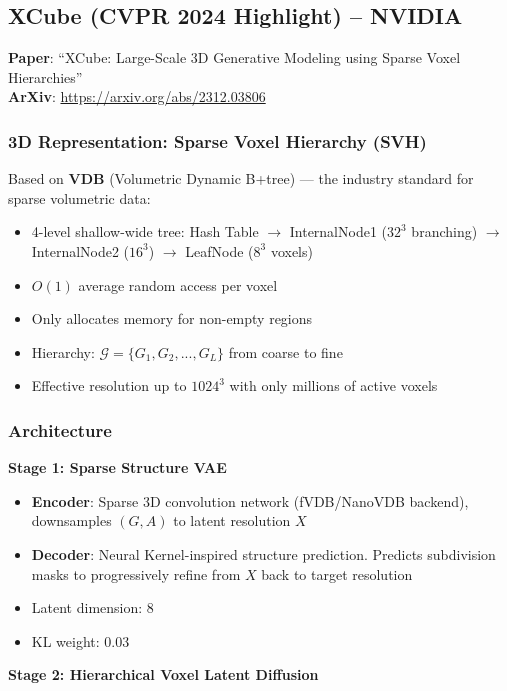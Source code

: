 \documentclass[11pt, a4paper]{article}
\begin{document}
\subsection{XCube (CVPR 2024 Highlight) -- NVIDIA}

\textbf{Paper}: ``XCube: Large-Scale 3D Generative Modeling using Sparse Voxel Hierarchies''\\
\textbf{ArXiv}: \url{https://arxiv.org/abs/2312.03806}

\subsubsection{3D Representation: Sparse Voxel Hierarchy (SVH)}

Based on \textbf{VDB} (Volumetric Dynamic B+tree) --- the industry standard for sparse volumetric data:
\begin{itemize}
    \item 4-level shallow-wide tree: Hash Table $\to$ InternalNode1 ($32^3$ branching) $\to$ InternalNode2 ($16^3$) $\to$ LeafNode ($8^3$ voxels)
    \item $O(1)$ average random access per voxel
    \item Only allocates memory for non-empty regions
    \item Hierarchy: $\mathcal{G} = \{G_1, G_2, ..., G_L\}$ from coarse to fine
    \item Effective resolution up to $1024^3$ with only millions of active voxels
\end{itemize}

\subsubsection{Architecture}

\textbf{Stage 1: Sparse Structure VAE}
\begin{itemize}
    \item \textbf{Encoder}: Sparse 3D convolution network (fVDB/NanoVDB backend), downsamples $(G, A)$ to latent resolution $X$
    \item \textbf{Decoder}: Neural Kernel-inspired structure prediction. Predicts subdivision masks to progressively refine from $X$ back to target resolution
    \item Latent dimension: 8
    \item KL weight: 0.03
\end{itemize}

\textbf{Stage 2: Hierarchical Voxel Latent Diffusion}
\end{document}
